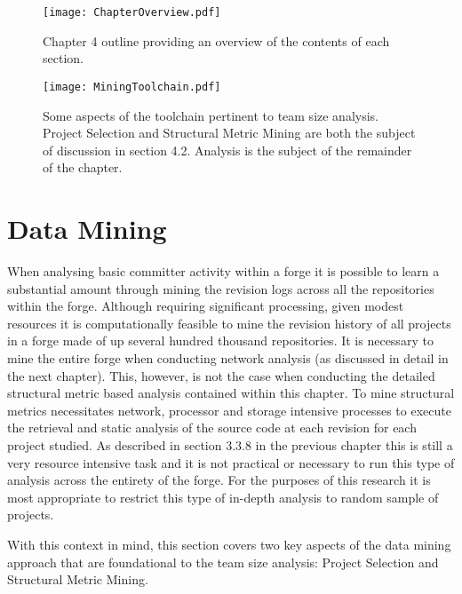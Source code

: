 \begin{landscape}
\begin{figure}[htbp!] 
\centering    
\texttt{[image: ChapterOverview.pdf]}
\caption{Chapter 4 outline providing an overview of the contents of each section.}
\label{fig:ChapterOverview}
\end{figure}
\end{landscape}

\begin{figure}[htbp!] 
\centering    
\texttt{[image: MiningToolchain.pdf]}
\caption[Some aspects of the toolchain pertinent to team size analysis.]{Some aspects of the toolchain pertinent to team size analysis. Project Selection and Structural Metric Mining are both the subject of discussion in section 4.2. Analysis is the subject of the remainder of the chapter.}
\label{fig:MiningToolchain}
\end{figure}
 

\section{Data Mining} %
When analysing basic committer activity within a forge it is possible to learn a substantial amount through mining the revision logs across all the repositories within the forge. Although requiring significant processing, given modest resources it is computationally feasible to mine the revision history of all projects in a forge made of up several hundred thousand repositories. It is necessary to mine the entire forge when conducting network analysis (as discussed in detail in the next chapter). This, however, is not the case when conducting the detailed structural metric based analysis contained within this chapter. To mine structural metrics necessitates network, processor and storage intensive processes to execute the retrieval and static analysis of the source code at each revision for each project studied. As described in section 3.3.8 in the previous chapter this is still a very resource intensive task and it is not practical or necessary to run this type of analysis across the entirety of the forge. For the purposes of this research it is most appropriate to restrict this type of in-depth analysis to random sample of projects. 

With this context in mind, this section covers two key aspects of the data mining approach that are foundational to the team size analysis: Project Selection and Structural Metric Mining. 

